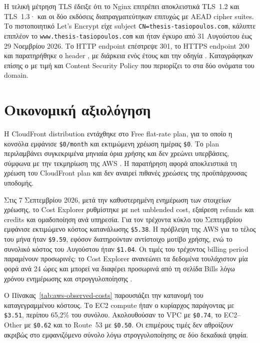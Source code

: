 Η τελική μέτρηση TLS έδειξε ότι το Nginx επιτρέπει αποκλειστικά TLS~1.2 και
TLS~1.3· και οι δύο εκδόσεις διαπραγματεύτηκαν επιτυχώς με AEAD cipher suites.
Το πιστοποιητικό Let's Encrypt είχε subject
\texttt{CN=thesis-tasiopoulos.com}, κάλυπτε επιπλέον το
\texttt{www.thesis-tasiopoulos.com} και ήταν έγκυρο από 31 Αυγούστου έως 29
Νοεμβρίου 2026. Το HTTP endpoint επέστρεψε 301, το HTTPS endpoint 200 και
παρατηρήθηκε ο header , με διάρκεια ενός
έτους και την οδηγία . Καταγράφηκαν επίσης ο
 με τιμή  και Content
Security Policy που περιορίζει το  στα δύο ονόματα
του domain.

\section{Οικονομική αξιολόγηση}
Η CloudFront distribution εντάχθηκε στο Free flat-rate plan, για το οποίο η
κονσόλα εμφάνισε \texttt{\$0/month} και εκτιμώμενη χρέωση ημέρας
\texttt{\$0}. Το plan περιλαμβάνει συγκεκριμένα μηνιαία όρια χρήσης και δεν
χρεώνει υπερβάσεις, σύμφωνα με την τεκμηρίωση της AWS
\cite{aws2026cloudfrontplans}. Η παρατήρηση αφορά αποκλειστικά τη χρέωση του
CloudFront plan και δεν αναιρεί πιθανές χρεώσεις της προϋπάρχουσας υποδομής.

Στις 7 Σεπτεμβρίου 2026, μετά την καθυστερημένη ενημέρωση των στοιχείων
χρέωσης, το Cost Explorer ρυθμίστηκε με net unblended cost, εξαίρεση refunds
και credits και ομαδοποίηση ανά υπηρεσία. Για τον τρέχοντα κύκλο του
Σεπτεμβρίου εμφάνισε εκτιμώμενο κόστος κατανάλωσης \texttt{\$5.38}. Η
πρόβλεψη της AWS για το τέλος του μήνα ήταν \texttt{\$9.59}, εφόσον
διατηρούνταν αντίστοιχο μοτίβο χρήσης, ενώ το συνολικό κόστος του Αυγούστου
ήταν \texttt{\$1.04}. Οι τιμές του τρέχοντος billing period παραμένουν
προσωρινές: το Cost Explorer ανανεώνει τα δεδομένα τουλάχιστον μία φορά ανά
24 ώρες και μπορεί να διαφέρει προσωρινά από τη σελίδα Bills λόγω χρόνου
ενημέρωσης και στρογγυλοποίησης
\cite{aws2026costexplorer,aws2026billingdifferences}.

Ο Πίνακας~\ref{tab:aws-observed-costs} παρουσιάζει την κατανομή του
καταγεγραμμένου κόστους. Το EC2 compute ήταν ο κυρίαρχος παράγοντας με
\texttt{\$3.51}, περίπου 65,2\% του συνόλου. Ακολουθούσαν το VPC με
\texttt{\$0.74}, το EC2--Other με \texttt{\$0.62} και το Route~53 με
\texttt{\$0.50}. Οι επιμέρους τιμές δεν αθροίζουν ακριβώς στο εμφανιζόμενο
σύνολο λόγω στρογγυλοποίησης σε δύο δεκαδικά ψηφία.

